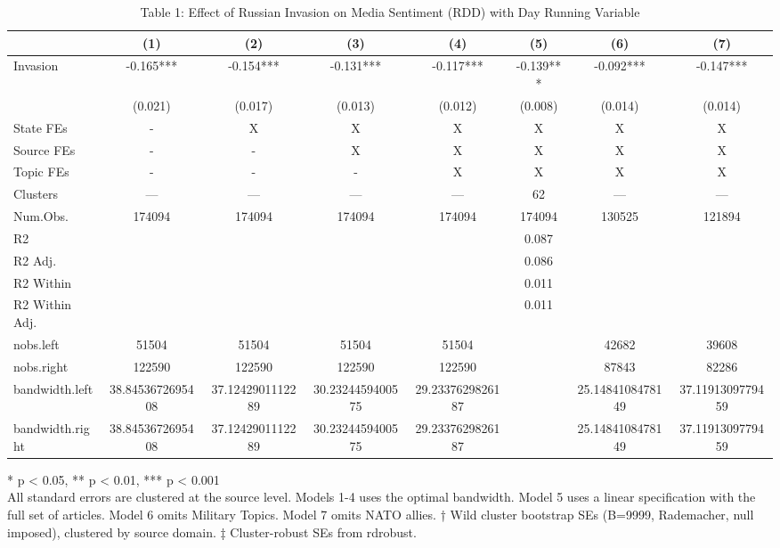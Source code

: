 \begin{table}[t]
\caption{\label{tab:table1}Table 1: Effect of Russian Invasion on Media Sentiment (RDD) with Day Running Variable} 
\fontsize{12.0pt}{14.0pt}\selectfont
\begin{tabular*}{\linewidth}{@{\extracolsep{\fill}}lccccccc}
\toprule
  & (1) & (2) & (3) & (4) & (5) & (6) & (7) \\ 
\midrule\addlinespace[2.5pt]
Invasion & -0.165*** & -0.154*** & -0.131*** & -0.117*** & -0.139*** & -0.092*** & -0.147*** \\ 
{} & {(0.021)} & {(0.017)} & {(0.013)} & {(0.012)} & {(0.008)} & {(0.014)} & {(0.014)} \\ 
State FEs & - & X & X & X & X & X & X \\ 
Source FEs & - & - & X & X & X & X & X \\ 
Topic FEs & - & - & - & X & X & X & X \\ 
Clusters & — & — & — & — & 62 & — & — \\ 
Num.Obs. & 174094 & 174094 & 174094 & 174094 & 174094 & 130525 & 121894 \\ 
R2 &  &  &  &  & 0.087 &  &  \\ 
R2 Adj. &  &  &  &  & 0.086 &  &  \\ 
R2 Within &  &  &  &  & 0.011 &  &  \\ 
R2 Within Adj. &  &  &  &  & 0.011 &  &  \\ 
nobs.left & 51504 & 51504 & 51504 & 51504 &  & 42682 & 39608 \\ 
nobs.right & 122590 & 122590 & 122590 & 122590 &  & 87843 & 82286 \\ 
bandwidth.left & 38.8453672695408 & 37.1242901112289 & 30.2324459400575 & 29.2337629826187 &  & 25.1484108478149 & 37.1191309779459 \\ 
bandwidth.right & 38.8453672695408 & 37.1242901112289 & 30.2324459400575 & 29.2337629826187 &  & 25.1484108478149 & 37.1191309779459 \\ 
\bottomrule
\end{tabular*}
\begin{minipage}{\linewidth}
\vspace{.05em}
* p < 0.05, ** p < 0.01, *** p < 0.001\\
All standard errors are clustered at the source level. Models 1-4 uses the
optimal bandwidth. Model 5 uses a linear specification with the full set of
articles. Model 6 omits Military Topics. Model 7 omits NATO allies. † Wild
cluster bootstrap SEs (B=9999, Rademacher, null imposed), clustered by source
domain. ‡ Cluster-robust SEs from rdrobust.\\
\end{minipage}
\end{table}

